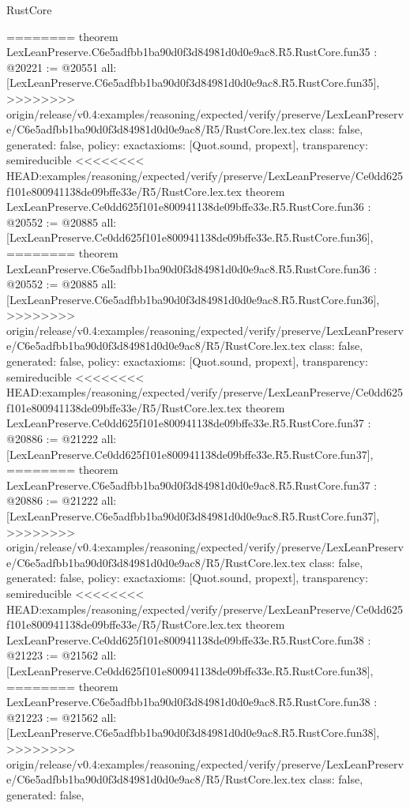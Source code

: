 \begin{lexlean}{RustCore}
\begin{coremodule}
{\begin{coremodule}
{{{{{{{{{{{{{{{{{{{{{{{{{{{{{{{{{{{{{{========
theorem LexLeanPreserve.C6e5adfbb1ba90d0f3d84981d0d0e9ac8.R5.RustCore.fun35 : @20221 := @20551 {
  all: [LexLeanPreserve.C6e5adfbb1ba90d0f3d84981d0d0e9ac8.R5.RustCore.fun35],
>>>>>>>> origin/release/v0.4:examples/reasoning/expected/verify/preserve/LexLeanPreserve/C6e5adfbb1ba90d0f3d84981d0d0e9ac8/R5/RustCore.lex.tex
  class: false,
  generated: false,
  policy: exact{axioms: [Quot.sound, propext]},
  transparency: semireducible
}
<<<<<<<< HEAD:examples/reasoning/expected/verify/preserve/LexLeanPreserve/Ce0dd625f101e800941138de09bffe33e/R5/RustCore.lex.tex
theorem LexLeanPreserve.Ce0dd625f101e800941138de09bffe33e.R5.RustCore.fun36 : @20552 := @20885 {
  all: [LexLeanPreserve.Ce0dd625f101e800941138de09bffe33e.R5.RustCore.fun36],
========
theorem LexLeanPreserve.C6e5adfbb1ba90d0f3d84981d0d0e9ac8.R5.RustCore.fun36 : @20552 := @20885 {
  all: [LexLeanPreserve.C6e5adfbb1ba90d0f3d84981d0d0e9ac8.R5.RustCore.fun36],
>>>>>>>> origin/release/v0.4:examples/reasoning/expected/verify/preserve/LexLeanPreserve/C6e5adfbb1ba90d0f3d84981d0d0e9ac8/R5/RustCore.lex.tex
  class: false,
  generated: false,
  policy: exact{axioms: [Quot.sound, propext]},
  transparency: semireducible
}
<<<<<<<< HEAD:examples/reasoning/expected/verify/preserve/LexLeanPreserve/Ce0dd625f101e800941138de09bffe33e/R5/RustCore.lex.tex
theorem LexLeanPreserve.Ce0dd625f101e800941138de09bffe33e.R5.RustCore.fun37 : @20886 := @21222 {
  all: [LexLeanPreserve.Ce0dd625f101e800941138de09bffe33e.R5.RustCore.fun37],
========
theorem LexLeanPreserve.C6e5adfbb1ba90d0f3d84981d0d0e9ac8.R5.RustCore.fun37 : @20886 := @21222 {
  all: [LexLeanPreserve.C6e5adfbb1ba90d0f3d84981d0d0e9ac8.R5.RustCore.fun37],
>>>>>>>> origin/release/v0.4:examples/reasoning/expected/verify/preserve/LexLeanPreserve/C6e5adfbb1ba90d0f3d84981d0d0e9ac8/R5/RustCore.lex.tex
  class: false,
  generated: false,
  policy: exact{axioms: [Quot.sound, propext]},
  transparency: semireducible
}
<<<<<<<< HEAD:examples/reasoning/expected/verify/preserve/LexLeanPreserve/Ce0dd625f101e800941138de09bffe33e/R5/RustCore.lex.tex
theorem LexLeanPreserve.Ce0dd625f101e800941138de09bffe33e.R5.RustCore.fun38 : @21223 := @21562 {
  all: [LexLeanPreserve.Ce0dd625f101e800941138de09bffe33e.R5.RustCore.fun38],
========
theorem LexLeanPreserve.C6e5adfbb1ba90d0f3d84981d0d0e9ac8.R5.RustCore.fun38 : @21223 := @21562 {
  all: [LexLeanPreserve.C6e5adfbb1ba90d0f3d84981d0d0e9ac8.R5.RustCore.fun38],
>>>>>>>> origin/release/v0.4:examples/reasoning/expected/verify/preserve/LexLeanPreserve/C6e5adfbb1ba90d0f3d84981d0d0e9ac8/R5/RustCore.lex.tex
  class: false,
  generated: false,
}}}}}}}}}}}}}}}}}}}}}}}}}}}}}}}}}}}}}}}}}}
\end{coremodule}}
\end{coremodule}
\end{lexlean}
